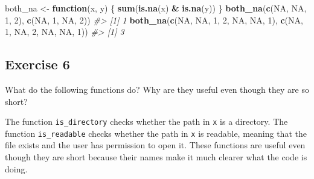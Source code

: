 \documentclass[]{book}
\newenvironment{Shaded}{\begin{snugshade}}{\end{snugshade}}
\newcommand{\CommentTok}[1]{\textcolor[rgb]{0.56,0.35,0.01}{\textit{#1}}}
\newcommand{\ControlFlowTok}[1]{\textcolor[rgb]{0.13,0.29,0.53}{\textbf{#1}}}
\newcommand{\DecValTok}[1]{\textcolor[rgb]{0.00,0.00,0.81}{#1}}
\newcommand{\KeywordTok}[1]{\textcolor[rgb]{0.13,0.29,0.53}{\textbf{#1}}}
\newcommand{\NormalTok}[1]{#1}
\newcommand{\OperatorTok}[1]{\textcolor[rgb]{0.81,0.36,0.00}{\textbf{#1}}}
\newcommand{\OtherTok}[1]{\textcolor[rgb]{0.56,0.35,0.01}{#1}}
\newcommand{\StringTok}[1]{\textcolor[rgb]{0.31,0.60,0.02}{#1}}
\theoremstyle{plain}
\theoremstyle{remark}
\theoremstyle{definition}
\theoremstyle{definition}
\theoremstyle{definition}
\theoremstyle{remark}
\begin{document}
\begin{Shaded}
\begin{Highlighting}[]
\NormalTok{both_na <-}\StringTok{ }\ControlFlowTok{function}\NormalTok{(x, y) \{}
  \KeywordTok{sum}\NormalTok{(}\KeywordTok{is.na}\NormalTok{(x) }\OperatorTok{&}\StringTok{ }\KeywordTok{is.na}\NormalTok{(y))}
\NormalTok{\}}
\KeywordTok{both_na}\NormalTok{(}\KeywordTok{c}\NormalTok{(}\OtherTok{NA}\NormalTok{, }\OtherTok{NA}\NormalTok{,  }\DecValTok{1}\NormalTok{, }\DecValTok{2}\NormalTok{),}
        \KeywordTok{c}\NormalTok{(}\OtherTok{NA}\NormalTok{,  }\DecValTok{1}\NormalTok{, }\OtherTok{NA}\NormalTok{, }\DecValTok{2}\NormalTok{))}
\CommentTok{#> [1] 1}
\KeywordTok{both_na}\NormalTok{(}\KeywordTok{c}\NormalTok{(}\OtherTok{NA}\NormalTok{, }\OtherTok{NA}\NormalTok{,  }\DecValTok{1}\NormalTok{, }\DecValTok{2}\NormalTok{, }\OtherTok{NA}\NormalTok{, }\OtherTok{NA}\NormalTok{, }\DecValTok{1}\NormalTok{),}
        \KeywordTok{c}\NormalTok{(}\OtherTok{NA}\NormalTok{,  }\DecValTok{1}\NormalTok{, }\OtherTok{NA}\NormalTok{, }\DecValTok{2}\NormalTok{, }\OtherTok{NA}\NormalTok{, }\OtherTok{NA}\NormalTok{, }\DecValTok{1}\NormalTok{))}
\CommentTok{#> [1] 3}
\end{Highlighting}
\end{Shaded}

\hypertarget{exercise-6-11}{%
\subsection{Exercise 6}\label{exercise-6-11}}

What do the following functions do? Why are they useful even though they
are so short?

\begin{Shaded}
\end{Shaded}

The function \texttt{is\_directory} checks whether the path in
\texttt{x} is a directory. The function \texttt{is\_readable} checks
whether the path in \texttt{x} is readable, meaning that the file exists
and the user has permission to open it. These functions are useful even
though they are short because their names make it much clearer what the
code is doing.
\end{document}
